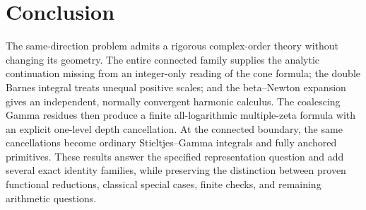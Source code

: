 \documentclass[11pt]{article}
\numberwithin{equation}{section}
\theoremstyle{definition}
\begin{document}
\section*{Conclusion}
The same-direction problem admits a rigorous complex-order theory without changing its geometry. The entire connected family supplies the analytic continuation missing from an integer-only reading of the cone formula; the double Barnes integral treats unequal positive scales; and the beta--Newton expansion gives an independent, normally convergent harmonic calculus. The coalescing Gamma residues then produce a finite all-logarithmic multiple-zeta formula with an explicit one-level depth cancellation. At the connected boundary, the same cancellations become ordinary Stieltjes--Gamma integrals and fully anchored primitives. These results answer the specified representation question and add several exact identity families, while preserving the distinction between proven functional reductions, classical special cases, finite checks, and remaining arithmetic questions.
\end{document}
